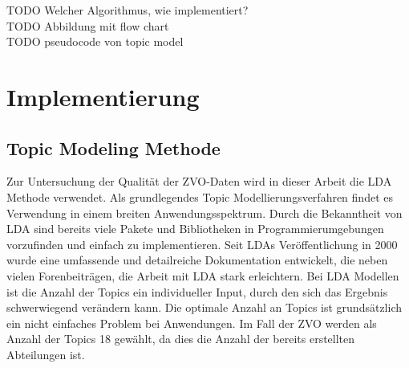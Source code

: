\documentclass[german,version-2020-11]{uzl-thesis}
\begin{document}
TODO Welcher Algorithmus, wie implementiert? \\
TODO Abbildung mit flow chart\\
TODO pseudocode von topic model


\chapter{Implementierung}%

\section{Topic Modeling Methode}
Zur Untersuchung der Qualität der ZVO-Daten wird in dieser Arbeit die LDA Methode verwendet. Als grundlegendes Topic Modellierungsverfahren findet es Verwendung in einem breiten Anwendungsspektrum. Durch die Bekanntheit von LDA sind bereits viele Pakete und Bibliotheken in Programmierumgebungen vorzufinden und einfach zu implementieren. Seit LDAs Veröffentlichung in 2000 wurde eine umfassende und detailreiche Dokumentation entwickelt, die neben vielen Forenbeiträgen, die Arbeit mit LDA stark erleichtern. Bei LDA Modellen ist die Anzahl der Topics ein individueller Input, durch den sich das Ergebnis schwerwiegend verändern kann. Die optimale Anzahl an Topics ist grundsätzlich ein nicht einfaches Problem bei Anwendungen. Im Fall der ZVO werden als Anzahl der Topics 18  gewählt, da dies die Anzahl der bereits erstellten Abteilungen ist. 
\end{document}
